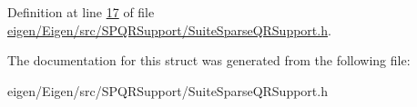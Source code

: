 Definition at line \hyperlink{eigen_2_eigen_2src_2_s_p_q_r_support_2_suite_sparse_q_r_support_8h_source_l00017}{17} of file \hyperlink{eigen_2_eigen_2src_2_s_p_q_r_support_2_suite_sparse_q_r_support_8h_source}{eigen/\+Eigen/src/\+S\+P\+Q\+R\+Support/\+Suite\+Sparse\+Q\+R\+Support.\+h}.



The documentation for this struct was generated from the following file\+:\begin{DoxyCompactItemize}
\item 
eigen/\+Eigen/src/\+S\+P\+Q\+R\+Support/\+Suite\+Sparse\+Q\+R\+Support.\+h\end{DoxyCompactItemize}
